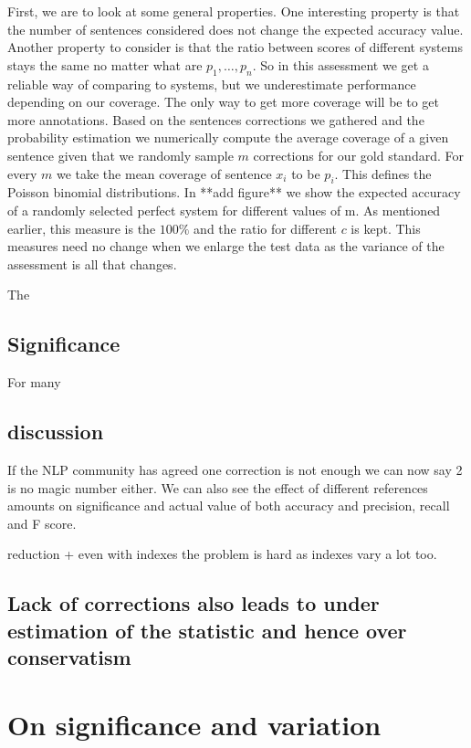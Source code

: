 \documentclass[english]{article}
\begin{document}
First, we are to look at some general properties.
 One interesting property is that the number of sentences considered does not change the expected accuracy value.
 Another property to consider is that the ratio between scores of different systems stays the same no matter what are $p_1,\ldots,p_n$. So in this assessment we get a reliable way of comparing to systems, but we underestimate performance depending on our coverage. The only way to get more coverage will be to get more annotations.
Based on the sentences corrections we gathered and the probability estimation we numerically compute the average coverage of a given sentence given that we randomly sample $m$ corrections for our gold standard. For every $m$ we take the mean coverage of sentence $x_i$ to be $p_i$. This defines the Poisson binomial distributions. In {*}{*}add figure{*}{*} we show the expected accuracy of a randomly selected perfect system for different values of m. As mentioned earlier, this measure is the $100\%$ and the ratio for different $c$ is kept. This measures need no change when we enlarge the test data as the variance of the assessment is all that changes. 

The

\subsection{Significance}

For many 

\subsection{discussion}

If the NLP community has agreed one correction is not enough\cite{tetreault2008native}
we can now say 2 is no magic number either. We can also see the effect of different references amounts on significance and actual value of both accuracy and precision, recall and F score.

reduction + even with indexes the problem is hard as indexes vary
a lot too.

\subsection{Lack of corrections also leads to under estimation of the statistic
and hence over conservatism}

\section{On significance and variation}
\end{document}
